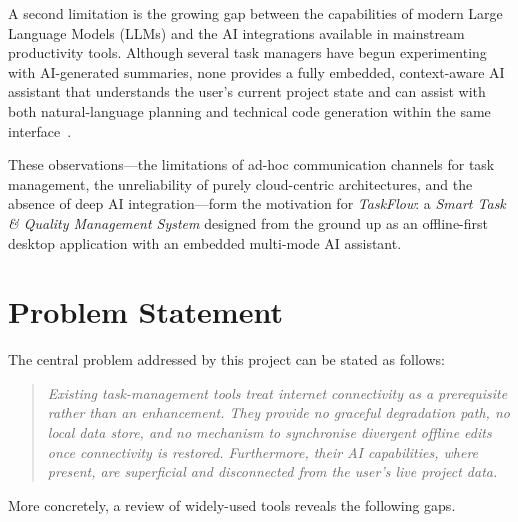 A second limitation is the growing gap between the capabilities of modern Large Language
Models (LLMs) and the AI integrations available in mainstream productivity tools.
Although several task managers have begun experimenting with AI-generated summaries,
none provides a fully embedded, context-aware AI assistant that understands the user's
current project state and can assist with both natural-language planning and technical
code generation within the same interface~\cite{jiang2023mistral}.

These observations---the limitations of ad-hoc communication channels for task management, the unreliability of purely cloud-centric architectures, and the
absence of deep AI integration---form the motivation for \textit{TaskFlow}: a
\emph{Smart Task \& Quality Management System} designed from the ground up as an
offline-first desktop application with an embedded multi-mode AI assistant.


\section{Problem Statement}\label{sec:intro_problem}

The central problem addressed by this project can be stated as follows:

\begin{quote}
\textit{Existing task-management tools treat internet connectivity as a prerequisite
rather than an enhancement.
They provide no graceful degradation path, no local data store, and no mechanism to
synchronise divergent offline edits once connectivity is restored.
Furthermore, their AI capabilities, where present, are superficial and disconnected
from the user's live project data.}
\end{quote}

More concretely, a review of widely-used tools reveals the following gaps.

